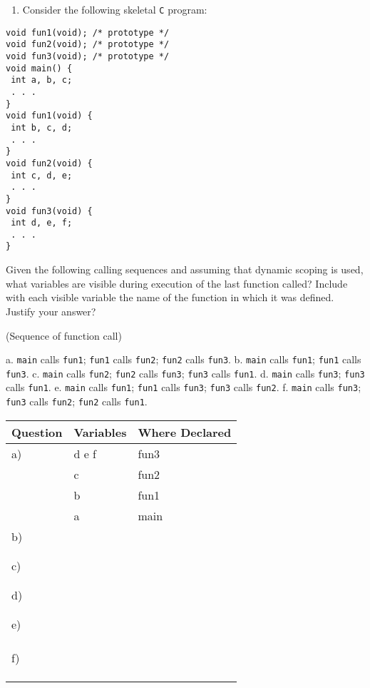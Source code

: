 \documentclass[11pt]{article}
\begin{document}
\begin{enumerate}
\item Consider the following skeletal \texttt{C} program:
\end{enumerate}

\begin{verbatim}
void fun1(void); /* prototype */
void fun2(void); /* prototype */
void fun3(void); /* prototype */
void main() {
 int a, b, c;
 . . .
}
void fun1(void) {
 int b, c, d;
 . . .
}
void fun2(void) {
 int c, d, e;
 . . .
}
void fun3(void) {
 int d, e, f;
 . . .
}
\end{verbatim}

Given the following calling sequences and assuming that dynamic scoping is used,
what variables are visible during execution of the last function called? Include
with each visible variable the name of the function in which it was defined.
Justify your answer?

(Sequence of function call)

a. \texttt{main} calls \texttt{fun1}; \texttt{fun1} calls \texttt{fun2}; \texttt{fun2} calls \texttt{fun3}.
b. \texttt{main} calls \texttt{fun1}; \texttt{fun1} calls \texttt{fun3}.
c. \texttt{main} calls \texttt{fun2}; \texttt{fun2} calls \texttt{fun3}; \texttt{fun3} calls \texttt{fun1}.
d. \texttt{main} calls \texttt{fun3}; \texttt{fun3} calls \texttt{fun1}.
e. \texttt{main} calls \texttt{fun1}; \texttt{fun1} calls \texttt{fun3}; \texttt{fun3} calls \texttt{fun2}.
f. \texttt{main} calls \texttt{fun3}; \texttt{fun3} calls \texttt{fun2}; \texttt{fun2} calls \texttt{fun1}.

\begin{center}
\begin{tabular}{lll}
\hline
Question & Variables & Where Declared\\
\hline
a) & d e f & fun3\\
 & c & fun2\\
 & b & fun1\\
 & a & main\\
\hline
b) &  & \\
 &  & \\
 &  & \\
\hline
c) &  & \\
 &  & \\
 &  & \\
\hline
d) &  & \\
 &  & \\
 &  & \\
\hline
e) &  & \\
 &  & \\
 &  & \\
 &  & \\
\hline
f) &  & \\
 &  & \\
 &  & \\
 &  & \\
\hline
\end{tabular}
\end{center}
\end{document}

